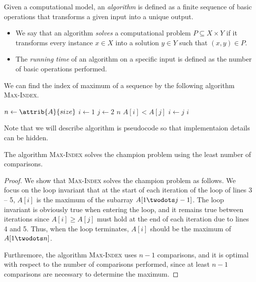 \begin{definition}
  Given a computational model, an \emph{algorithm} is defined as a finite
  sequence of basic operations that transforms a given input into a unique
  output.
  \begin{itemize}
    \item We say that an algorithm \emph{solves} a computational problem
    $P \subseteq X \times Y$ if it transforms every instance $x \in X$ into a
    solution $y \in Y$ such that $(x, y) \in P$.
    \item The \emph{running time} of an algorithm on a specific input is
    defined as the number of basic operations performed.
  \end{itemize}
\end{definition}

\begin{example}
  We can find the index of maximum of a sequence by the following algorithm
  \textsc{Max-Index}.
  \begin{codebox}
    \li $n \gets \attrib{A}{size}$
    \li $i \gets 1$
    \li \For $j \gets 2$ \To $n$ \Do
    \li     \If $A[i] < A[j]$ \Then
    \li         $i \gets j$
            \End
        \End
    \li \Return $i$
  \end{codebox}
  Note that we will describe algorithm is pseudocode so that implementaion
  details can be hidden.
\end{example}

\begin{theorem}
  The algorithm \textsc{Max-Index} solves the champion problem using the least
  number of comparisons.
\end{theorem}
\begin{proof}
  We show that \textsc{Max-Index} solves the champion problem as follows.
  We focus on the loop invariant that at the start of each iteration of the
  \For loop of lines 3 -- 5, $A[i]$ is the maximum of the subarray
  $A[1 \twodots j-1]$.
  The loop invariant is obviously true when entering the loop, and it remains
  true between iterations since $A[i] \geq A[j]$ must hold at the end of each
  iteration due to lines 4 and 5.
  Thus, when the \For loop terminates, $A[i]$ should be the maximum of
  $A[1 \twodots n]$.

  Furthremore, the algorithm \textsc{Max-Index} uses $n-1$ comparisons, and it
  is optimal with respect to the number of comparisons performed, since at
  least $n-1$ comparisons are necessary to determine the maximum.
\end{proof}